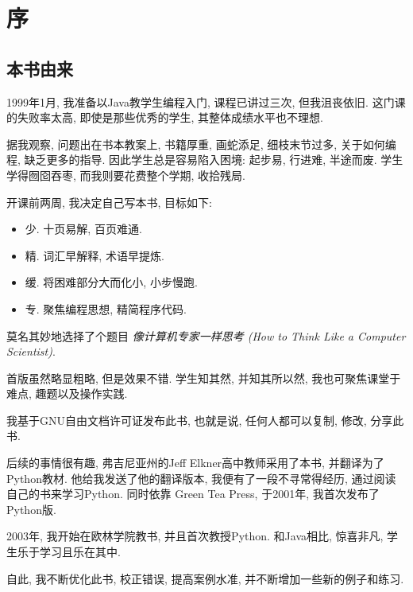 \documentclass[10pt]{book}
\begin{document}
\fi


\chapter{序}

\section*{本书由来}

1999年1月, 我准备以Java教学生编程入门, 
课程已讲过三次, 但我沮丧依旧. 
这门课的失败率太高, 即使是那些优秀的学生, 其整体成绩水平也不理想.

据我观察, 问题出在书本教案上, 
书籍厚重, 画蛇添足, 细枝末节过多, 关于如何编程, 缺乏更多的指导.
因此学生总是容易陷入困境: 起步易, 行进难, 半途而废.
学生学得囫囵吞枣, 而我则要花费整个学期, 收拾残局.

开课前两周, 我决定自己写本书, 目标如下: 

\begin{itemize}

\item 少. 十页易解, 百页难通.

\item 精. 词汇早解释, 术语早提炼.

\item 缓. 将困难部分大而化小, 小步慢跑.

\item 专. 聚焦编程思想, 精简程序代码.

\end{itemize}

莫名其妙地选择了个题目 {\em 像计算机专家一样思考
(How to Think Like a Computer Scientist)}.

首版虽然略显粗略, 但是效果不错. 
学生知其然, 并知其所以然, 我也可聚焦课堂于难点, 趣题以及操作实践. 

我基于GNU自由文档许可证发布此书, 
也就是说, 任何人都可以复制, 修改, 分享此书. 

后续的事情很有趣, 弗吉尼亚州的Jeff Elkner高中教师采用了本书, 
并翻译为了Python教材. 他给我发送了他的翻译版本, 
我便有了一段不寻常得经历, 通过阅读自己的书来学习Python.  
同时依靠 Green Tea Press, 于2001年, 我首次发布了Python版. 

2003年, 我开始在欧林学院教书, 并且首次教授Python. 
和Java相比, 惊喜非凡, 学生乐于学习且乐在其中. 

自此, 我不断优化此书, 校正错误, 提高案例水准, 
并不断增加一些新的例子和练习. 
\end{document}
